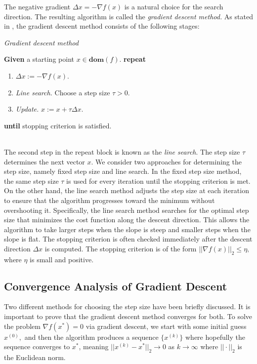 The negative gradient $\Delta x = -\nabla f(x)$ is a natural choice for the search direction. The resulting algorithm is called the \textit{gradient descent method.} As stated in \cite[466]{boyd2004convex}, the gradient descent method consists of the following stages:
\begin{algorithm}
\caption{\textit{Gradient descent method}}\label{Pseudocode_GD}
\begin{algorithmic}
\State \textbf{Given} a starting point $x \in \textbf{dom} (f)$.
\vspace{0.03cm}
\State \textbf{repeat}\\
\begin{enumerate}
    \item $\Delta x := -\nabla f(x).$
    \item \textit{Line search.} Choose a step size $\tau > 0.$
    \item \textit{Update.} $x := x + \tau \Delta x.$
\end{enumerate}
\State \textbf{until} stopping criterion is satisfied.
\end{algorithmic}
\end{algorithm}\\
The second step in the repeat block is known as the \textit{line search}. The step size $\tau$ determines the next vector $x$. We consider two approaches for determining the step size, namely fixed step size and line search. In the fixed step size method, the same step size $\tau$ is used for every iteration until the stopping criterion is met. On the other hand, the line search method adjusts the step size at each iteration to ensure that the algorithm progresses toward the minimum without overshooting it. Specifically, the line search method searches for the optimal step size that minimizes the cost function along the descent direction. This allows the algorithm to take larger steps when the slope is steep and smaller steps when the slope is flat. The stopping criterion is often checked immediately after the descent direction $\Delta x$ is computed. The stopping criterion is of the form $||\nabla f(x)||_{2} \leq \eta,$ where $\eta$ is small and positive. 

\subsection{Convergence Analysis of Gradient Descent}
Two different methods for choosing the step size have been briefly discussed. It is important to prove that the gradient descent method converges for both. To solve the problem $\nabla f(x^{*}) = 0$ via gradient descent, we start with some initial guess $x^{(0)},$ and then the algorithm produces a sequence $\{x^{(k)}\}$ where hopefully the sequence converges to $x^{*}$, meaning $||x^{(k)}-x^{*}||_{2} \rightarrow 0$ as $k \rightarrow \infty$ where $||\cdot||_{2}$ is the Euclidean norm.
